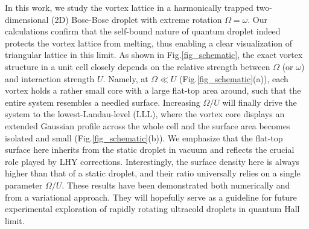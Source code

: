 \documentclass[reprint,aps,prl,twocolumn,superscriptaddress]{revtex4-1}
\begin{document}
In this work, we study the vortex lattice in a harmonically trapped two-dimensional (2D) Bose-Bose droplet with extreme rotation $\Omega=\omega$. Our calculations confirm that %
the self-bound nature of quantum droplet indeed protects the vortex lattice from melting, thus enabling a clear visualization of  triangular lattice in this limit. As shown in Fig.\ref{fig_schematic}, the exact vortex structure in a unit cell closely depends on the relative strength between $\Omega$ (or $\omega$) and interaction strength $U$. Namely, at $\Omega\ll U$ (Fig.\ref{fig_schematic}(a)), each vortex holds a rather small core with a large flat-top area around, such that the entire system resembles a needled surface. Increasing $\Omega/U$ will finally drive the system to the lowest-Landau-level (LLL), where the vortex core displays an extended Gaussian profile across the whole cell and the surface area becomes isolated and small (Fig.\ref{fig_schematic}(b)).
We emphasize that the flat-top surface here %
inherits from the static droplet in vacuum and  reflects the crucial role played by LHY corrections. %
Interestingly, the surface density here is always higher than that of a static droplet, and their ratio universally relies on a single parameter $\Omega/U$. These results have been demonstrated both numerically and from a variational approach. They will hopefully serve as a guideline for  future
experimental exploration of rapidly rotating ultracold droplets in quantum Hall limit.
\end{document}
